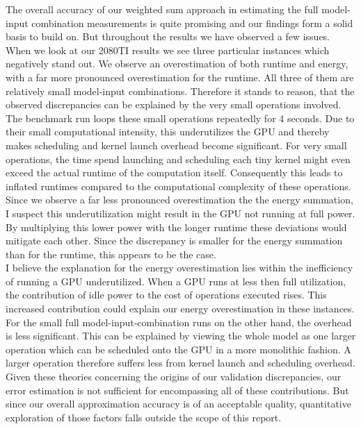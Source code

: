 \documentclass[conference]{IEEEtran}
\begin{document}
The overall accuracy of our weighted sum approach in estimating the full model-input combination measurements is quite promising and our findings form a solid basis to build on. But throughout the results we have observed a few issues. \\
When we look at our 2080TI results we see three particular instances which negatively stand out. We observe an overestimation of both runtime and energy, with a far more pronounced overestimation for the runtime. All three of them are relatively small model-input combinations. Therefore it stands to reason, that the observed discrepancies can be explained by the very small operations involved. \\
The benchmark run loops these small operations repeatedly for 4 seconds. Due to their small computational intensity, this underutilizes the GPU and thereby makes scheduling and kernel launch overhead become significant. For very small operations, the time spend launching and scheduling each tiny kernel might even exceed the actual runtime of the computation itself. Consequently this leads to inflated runtimes compared to the computational complexity of these operations. \\
Since we observe a far less pronounced overestimation the the energy summation, I suspect this underutilization might result in the GPU not running at full power. By multiplying this lower power with the longer runtime these deviations would mitigate each other. Since the discrepancy is smaller for the energy summation than for the runtime, this appears to be the case. \\
I believe the explanation for the energy overestimation lies within the inefficiency of running a GPU underutilized. When a GPU runs at less then full utilization, the contribution of idle power to the cost of operations executed rises. This increased contribution could explain our energy overestimation in these instances. \\
For the small full model-input-combination runs on the other hand, the overhead is less significant. This can be explained by viewing the whole model as one larger operation which can be scheduled onto the GPU in a more monolithic fashion. A larger operation therefore suffers less from kernel launch and scheduling overhead. \\
Given these theories concerning the origins of our validation discrepancies, our error estimation is not sufficient for encompassing all of these contributions. But since our overall approximation accuracy is of an acceptable quality, quantitative exploration of those factors falls outside the scope of this report. \\
\end{document}
